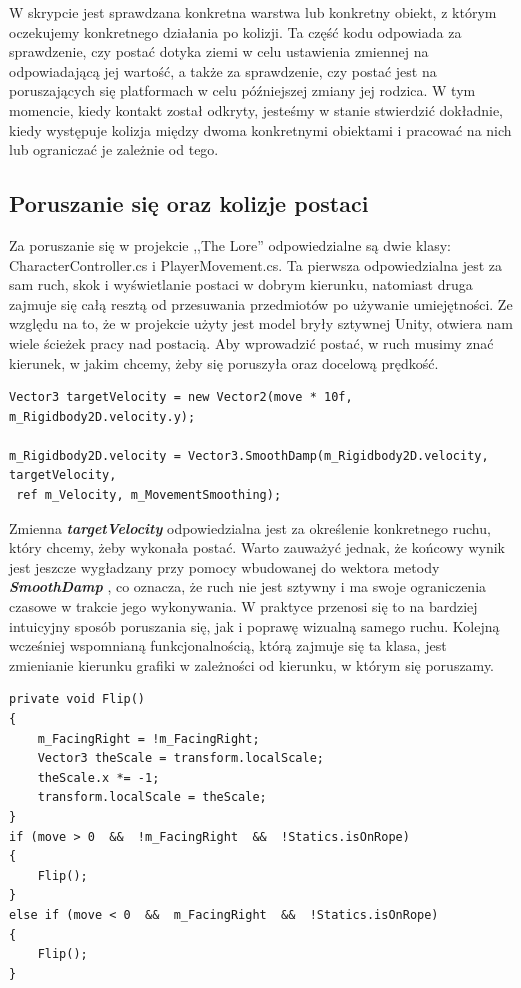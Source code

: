 \documentclass[oneside,polski,logo]{amuthesis}
\begin{document}
W skrypcie jest sprawdzana konkretna warstwa lub konkretny obiekt, z którym oczekujemy konkretnego działania po kolizji.
Ta część kodu odpowiada za sprawdzenie, czy postać dotyka ziemi w celu ustawienia zmiennej na odpowiadającą jej wartość, a także za sprawdzenie, czy postać jest na poruszających się platformach w celu późniejszej zmiany jej rodzica.
W tym momencie, kiedy kontakt został odkryty, jesteśmy w stanie stwierdzić dokładnie, kiedy występuje kolizja między dwoma konkretnymi obiektami i pracować na nich lub ograniczać je zależnie od tego.

\subsection{Poruszanie się oraz kolizje postaci}
Za poruszanie się w projekcie ,,The Lore'' odpowiedzialne są dwie klasy: CharacterController.cs i PlayerMovement.cs. Ta pierwsza odpowiedzialna jest za sam ruch, skok i wyświetlanie postaci w dobrym kierunku, natomiast druga zajmuje się całą resztą od przesuwania przedmiotów po używanie umiejętności. Ze względu na to, że w projekcie użyty jest model bryły sztywnej Unity, otwiera nam wiele ścieżek pracy nad postacią. Aby wprowadzić postać, w ruch musimy znać kierunek, w jakim chcemy, żeby się poruszyła oraz docelową prędkość.


\begin{lstlisting}[breaklines=true,
language={[Sharp]C},
rulecolor=\color{blue!80!black},
caption={Fragment klasy \texttt{CharacterController.cs}}
]
Vector3 targetVelocity = new Vector2(move * 10f, m_Rigidbody2D.velocity.y);

m_Rigidbody2D.velocity = Vector3.SmoothDamp(m_Rigidbody2D.velocity, targetVelocity,
 ref m_Velocity, m_MovementSmoothing);
\end{lstlisting}

Zmienna \textbf{\textit{targetVelocity}} odpowiedzialna jest za określenie konkretnego ruchu, który chcemy, żeby wykonała postać. Warto zauważyć jednak, że końcowy wynik jest jeszcze wygładzany przy pomocy wbudowanej do wektora metody \textbf{\textit{SmoothDamp}} \cite{physics2}, co oznacza, że ruch nie jest sztywny i ma swoje ograniczenia czasowe w trakcie jego wykonywania. W praktyce przenosi się to na bardziej intuicyjny sposób poruszania się, jak i poprawę wizualną samego ruchu.
Kolejną wcześniej wspomnianą funkcjonalnością, którą zajmuje się ta klasa, jest zmienianie kierunku grafiki w zależności od kierunku, w którym się poruszamy.


\begin{lstlisting}[breaklines=true,
language={[Sharp]C},
rulecolor=\color{blue!80!black},
caption={Fragment klasy \texttt{CharacterController.cs}}
]
private void Flip()
{
	m_FacingRight = !m_FacingRight;
	Vector3 theScale = transform.localScale;
	theScale.x *= -1;
	transform.localScale = theScale;
}
if (move > 0  &&  !m_FacingRight  &&  !Statics.isOnRope)
{
	Flip();
}
else if (move < 0  &&  m_FacingRight  &&  !Statics.isOnRope)
{ 
	Flip();
}
\end{lstlisting}
\end{document}
